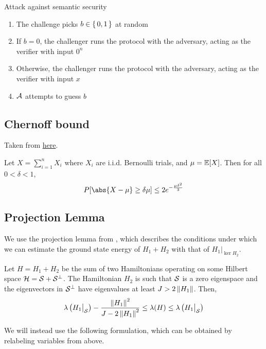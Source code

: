 \begin{protocol}{Attack against semantic security}
	\label{proto:indcpa}
	\begin{enumerate}
		\item The challenge picks $b\in\set{0,1}$ at random
		\item If $b=0$, the challenger runs the protocol with the adversary, acting as the verifier with input $0^n$
		\item Otherwise, the challenger runs the protocol with the adversary, acting as the verifier with input $x$
		\item $\mathcal{A}$ attempts to guess $b$
	\end{enumerate}
\end{protocol}

\subsection{Chernoff bound}

Taken from \href{http://math.mit.edu/~goemans/18310S15/chernoff-notes.pdf}{here}.

\begin{thm}
\label{thm:Chernoff}
Let $X=\sum_{i=1}^n X_i$ where $X_i$ are i.i.d. Bernoulli trials, and $\mu=\operatorname*{\mathbb{E}}[X]$.
Then for all $0<\delta<1$,
$$P[\abs{X-\mu}\geq\delta\mu]\leq2e^{-\frac{\mu\delta^2}{3}}$$
\end{thm}

\subsection{Projection Lemma}

We use the projection lemma from \cite{kempe_kitaev_regev_2006}, which describes the conditions under which we can estimate the ground state energy of $H_1 + H_2$ with that of $H_1\big|_{\ker H_2}$.

\begin{thm}
	Let $H=H_1+H_2$ be the sum of two Hamiltonians operating on some Hilbert space $\mathcal{H}=\mathcal{S}+\mathcal{S}^\bot$.
	The Hamiltonian $H_2$ is such that $\mathcal{S}$ is a zero eigenspace and the eigenvectors in $\mathcal{S}^\bot$ have eigenvalues at least $J>2\left\lVert H_1\right\rVert$. Then,
	$$\lambda\left(H_1\big|_{\mathcal{S}}\right)-\frac{\left\lVert H_1\right\rVert^2}{J-2\left\lVert H_1\right\rVert^2}\leq\lambda(H)\leq\lambda\left(H_1\big|_{\mathcal{S}}\right)$$
\end{thm}

We will instead use the following formulation, which can be obtained by relabeling variables from above.

